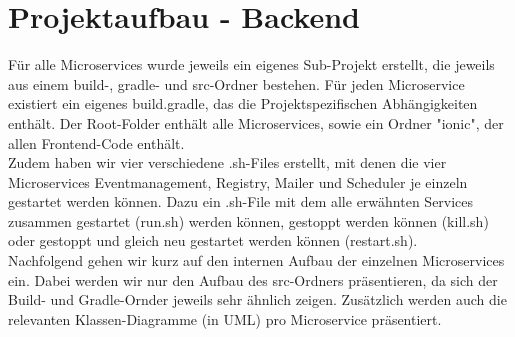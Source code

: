 \documentclass[11pt]{article} %
\begin{document}
\section{Projektaufbau - Backend}
Für alle Microservices wurde jeweils ein eigenes Sub-Projekt erstellt, die jeweils aus einem build-, gradle- und src-Ordner bestehen. Für jeden Microservice existiert ein eigenes build.gradle, das die Projektspezifischen Abhängigkeiten enthält.
Der Root-Folder enthält alle Microservices, sowie ein Ordner "ionic", der allen Frontend-Code enthält.
\\
Zudem haben wir vier verschiedene .sh-Files erstellt, mit denen die vier Microservices Eventmanagement, Registry, Mailer und Scheduler je einzeln gestartet werden können. Dazu ein .sh-File mit dem alle erwähnten Services zusammen gestartet (run.sh) werden können, gestoppt werden können (kill.sh) oder gestoppt und gleich neu gestartet werden können (restart.sh).
\\
Nachfolgend gehen wir kurz auf den internen Aufbau der einzelnen Microservices ein. Dabei werden wir nur den Aufbau des src-Ordners präsentieren, da sich der Build- und Gradle-Ornder jeweils sehr ähnlich zeigen. Zusätzlich werden auch die relevanten Klassen-Diagramme (in UML) pro Microservice präsentiert.
\end{document}
